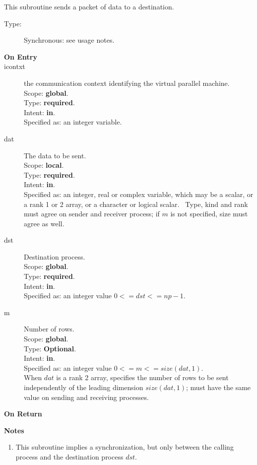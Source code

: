 This subroutine sends a packet of data to a destination.
\begin{description}
\item[Type:] Synchronous: see usage notes. 
\item[\bf  On Entry ]
\item[icontxt] the communication context identifying the virtual
  parallel machine.\\
Scope: {\bf global}.\\
Type: {\bf required}.\\
Intent: {\bf in}.\\
Specified as: an integer variable.
\item[dat] The data to be sent.\\
Scope: {\bf local}.\\
Type: {\bf required}.\\
Intent: {\bf in}.\\
Specified as: an integer, real or complex variable, which may be a
scalar, or a rank 1 or 2 array, or a character or logical scalar. \
Type, kind and  rank must agree on sender and receiver process; if $m$ is
not specified, size must agree as well. 
\item[dst] Destination process.\\
Scope: {\bf global}.\\
Type: {\bf required}.\\
Intent: {\bf in}.\\
Specified as: an integer value $0<= dst <= np-1$. \\
\item[m] Number of rows.\\
Scope: {\bf global}.\\
Type: {\bf Optional}.\\
Intent: {\bf in}.\\
Specified as: an integer value $0<= m <= size(dat,1)$. \\
When $dat$ is a rank 2 array, specifies the number of rows to be sent
independently of the leading dimension $size(dat,1)$; must have the
same value on sending and receiving processes.
\end{description}


\begin{description}
\item[\bf On Return]
\end{description}

{\par\noindent\large\bfseries Notes}
\begin{enumerate}
\item This subroutine implies a synchronization, but only between the
  calling process and the destination  process $dst$.
\end{enumerate}


